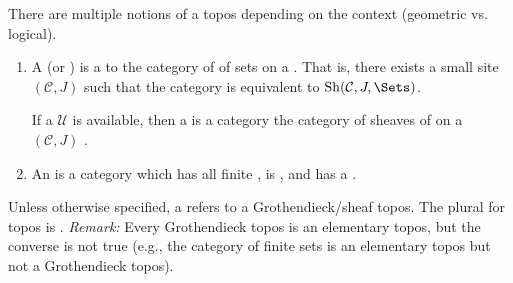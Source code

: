 \begin{definition}[Topos] \label{definition:topos}
    There are multiple notions of a topos depending on the context (geometric vs. logical).
    \begin{enumerate}
        \item A  (or ) is a   to the category of  of sets on a . That is, there exists a small site $(\mathcal{C}, J)$ such that the category is equivalent to $\operatorname{Sh}(\mathcal{C}, J, \Sets)$.

        If a  $\mathscr{U}$ is available, then a  is a category  the category of sheaves of  on a  $(\mathcal{C}, J)$ \cite[Expos\'e IV D\'efinition 1.1]{SGA4_I}.

        \item An  is a category which has all finite , is , and has a .
    \end{enumerate}
    Unless otherwise specified, a  refers to a Grothendieck/sheaf topos. The plural for topos is .
    \textit{Remark:} Every Grothendieck topos is an elementary topos, but the converse is not true (e.g., the category of finite sets is an elementary topos but not a Grothendieck topos).
\end{definition}



